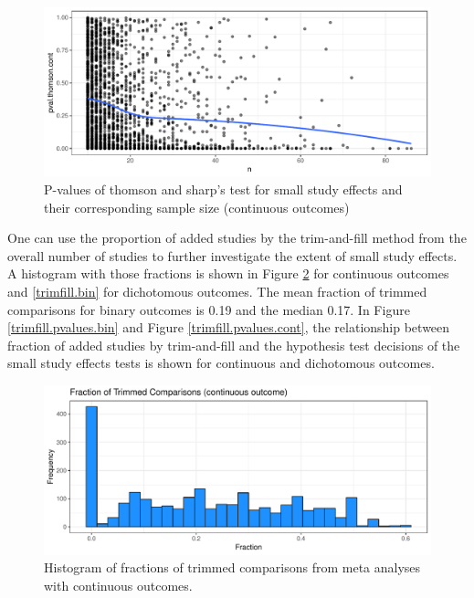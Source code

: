 \documentclass[11pt,a4paper,twoside]{book}\usepackage[]{graphicx}\usepackage[]{color}
\newenvironment{knitrout}{}{} %
\begin{document}
\begin{figure}
\begin{knitrout}
\color{fgcolor}

{\centering \includegraphics[width=\textwidth-3cm]{figure/ch02_figunnamed-chunk-23-1} 

}



\end{knitrout}
\caption{P-values of thomson and sharp's test for small study effects and their corresponding sample size (continuous outcomes)}
\label{pvalues.samplesize.cont}
\end{figure}




\vspace{0mm}
One can use the proportion of added studies by the trim-and-fill method from the overall number of studies to further investigate the extent of small study effects. A histogram with those fractions is shown in Figure \ref{trimfill.cont} for continuous outcomes and \ref{trimfill.bin} for dichotomous outcomes. The mean fraction of trimmed comparisons for binary outcomes is 0.19 and the median 0.17. In Figure \ref{trimfill.pvalues.bin} and Figure \ref{trimfill.pvalues.cont}, the relationship between fraction of added studies by trim-and-fill and the hypothesis test decisions of the small study effects tests is shown for continuous and dichotomous outcomes.

\begin{figure}
\begin{knitrout}
\color{fgcolor}

{\centering \includegraphics[width=\textwidth-3cm]{figure/ch02_figunnamed-chunk-25-1} 

}



\end{knitrout}
\caption{Histogram of fractions of trimmed comparisons from meta analyses with continuous outcomes.}
\label{trimfill.cont}
\end{figure}
\end{document}
